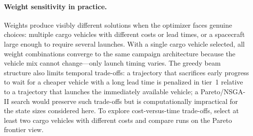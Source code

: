 \paragraph{Weight sensitivity in practice.}
Weights produce visibly different solutions when the optimizer
faces genuine choices: multiple cargo vehicles with different
costs or lead times, or a spacecraft large enough to require
several launches.
With a single cargo vehicle selected, all weight combinations
converge to the same campaign architecture because the vehicle
mix cannot change---only launch timing varies.
The greedy beam structure also limits temporal trade-offs: a
trajectory that sacrifices early progress to wait for a cheaper
vehicle with a long lead time is penalized in tier~1 relative to
a trajectory that launches the immediately available vehicle; a
Pareto/NSGA-II search would preserve such trade-offs but is
computationally impractical for the state sizes considered here.
To explore cost-versus-time trade-offs, select at least two cargo
vehicles with different costs and compare runs on the Pareto
frontier view.

